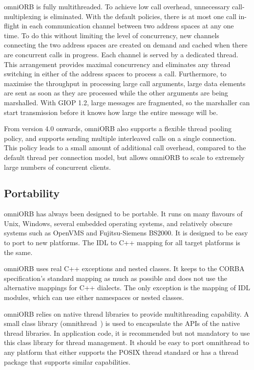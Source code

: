 \documentclass[11pt,twoside,a4paper]{book}
\begin{document}
omniORB is fully multithreaded. To achieve low call overhead,
unnecessary call-multiplexing is eliminated. With the default
policies, there is at most one call in-flight in each communication
channel between two address spaces at any one time. To do this without
limiting the level of concurrency, new channels connecting the two
address spaces are created on demand and cached when there are
concurrent calls in progress. Each channel is served by a dedicated
thread. This arrangement provides maximal concurrency and eliminates
any thread switching in either of the address spaces to process a
call. Furthermore, to maximise the throughput in processing large call
arguments, large data elements are sent as soon as they are processed
while the other arguments are being marshalled. With GIOP 1.2, large
messages are fragmented, so the marshaller can start transmission
before it knows how large the entire message will be.

From version 4.0 onwards, omniORB also supports a flexible thread
pooling policy, and supports sending multiple interleaved calls on a
single connection. This policy leads to a small amount of additional
call overhead, compared to the default thread per connection model,
but allows omniORB to scale to extremely large numbers of concurrent
clients.

\subsection{Portability}

omniORB has always been designed to be portable. It runs on many
flavours of Unix, Windows, several embedded operating systems, and
relatively obscure systems such as OpenVMS and Fujitsu-Siemens BS2000.
It is designed to be easy to port to new platforms. The IDL to C++
mapping for all target platforms is the same.

omniORB uses real C++ exceptions and nested classes. It keeps to the
CORBA specification's standard mapping as much as possible and does
not use the alternative mappings for C++ dialects. The only exception
is the mapping of IDL modules, which can use either namespaces or
nested classes.

omniORB relies on native thread libraries to provide multithreading
capability. A small class library (omnithread~\cite{tjr96a}) is used
to encapsulate the APIs of the native thread libraries. In application
code, it is recommended but not mandatory to use this class library
for thread management. It should be easy to port omnithread to any
platform that either supports the POSIX thread standard or has a
thread package that supports similar capabilities.
\end{document}
